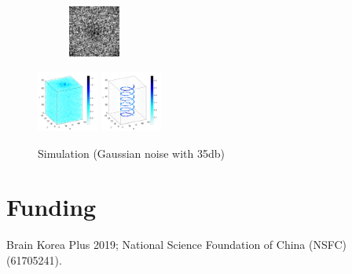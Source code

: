 \documentclass[9pt,twocolumn,twoside]{osajnl}
\begin{document}
\begin{figure}[htbp]
\begin{minipage}[b]{1\textwidth}
\begin{subfigure}[b]{0.18\textwidth}
  \includegraphics[width=0.45\columnwidth]{cirhelix_complex_holo}
\end{subfigure}
\includegraphics[width=0.18\textwidth]{cirhelix_complex_BP_3d}
\includegraphics[width=0.18\textwidth]{cirhelix_complex_TwIST_3d}
\subcaption{}
\end{minipage}
\caption{Simulation (Gaussian noise with 35db)}
\label{fig_sim}
\end{figure}



\section{Funding}

Brain Korea Plus 2019; National Science Foundation of China (NSFC) (61705241).




\end{document}
